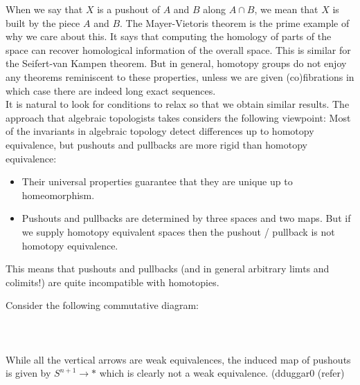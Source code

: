 \documentclass[a4paper]{article}
\begin{document}
When we say that $X$ is a pushout of $A$ and $B$ along $A\cap B$, we mean that $X$ is built by the piece $A$ and $B$. The Mayer-Vietoris theorem is the prime example of why we care about this. It says that computing the homology of parts of the space can recover homological information of the overall space. This is similar for the Seifert-van Kampen theorem. But in general, homotopy groups do not enjoy any theorems reminiscent to these properties, unless we are given (co)fibrations in which case there are indeed long exact sequences. \\

It is natural to look for conditions to relax so that we obtain similar results. The approach that algebraic topologists takes considers the following viewpoint: Most of the invariants in algebraic topology detect differences up to homotopy equivalence, but pushouts and pullbacks are more rigid than homotopy equivalence: 

\begin{itemize}
\item Their universal properties guarantee that they are unique up to homeomorphism. 
\item Pushouts and pullbacks are determined by three spaces and two maps. But if we supply homotopy equivalent spaces then the pushout / pullback is not homotopy equivalence. 
\end{itemize}

This means that pushouts and pullbacks (and in general arbitrary limts and colimits!) are quite incompatible with homotopies. 

\begin{eg}{}{} Consider the following commutative diagram:  \\~\\
\\~\\
While all the vertical arrows are weak equivalences, the induced map of pushouts is given by $S^{n+1}\to\ast$ which is clearly not a weak equivalence. (dduggar0 (refer)
\end{eg}
\end{document}
